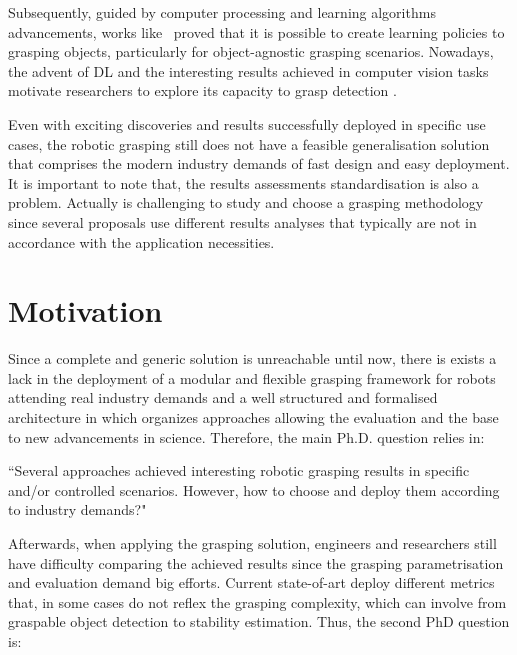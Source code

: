 Subsequently, guided by computer processing and learning algorithms advancements,  works like~\cite{Saxena2008} proved that it is possible to create learning policies to grasping objects, particularly for object-agnostic grasping scenarios. Nowadays, the advent of \ac{DL} and the interesting results achieved in computer vision tasks motivate researchers to explore its capacity to grasp detection \cite{Lenz2015,Redmon2015,Kumra2017,Watson2017,Chu2018,asif2018ensemblenet, Chen2020, Guo2017,Gariepy2019,Mousavian_2019_ICCV,Ghazaei2019,TenPas2017,Chen2019,
Mahler2016,Mahler2017b, Mahler2017d, Mahler2017,Mahler2019,song2020novel}. 

Even with exciting discoveries and results successfully deployed in specific use cases, the robotic grasping still does not have a feasible generalisation solution that comprises the modern industry demands of fast design and easy deployment. It is important to note that, the results assessments standardisation is also a problem. Actually is challenging to study and choose a grasping methodology since several proposals use different results analyses that typically are not in accordance with the application necessities. 


\section{Motivation}
\label{cap1:introduction:motiviation}




Since a complete and generic solution is unreachable until now, there is exists a lack in the deployment of a modular and flexible grasping framework for robots attending real industry demands and a well structured and formalised architecture in which organizes approaches allowing the evaluation and the base to new advancements in science. Therefore, the main Ph.D. question relies in:

\begin{flushright}
``Several approaches achieved interesting robotic grasping results in specific and/or controlled scenarios. However, how to choose and deploy them according to industry demands?"
\end{flushright}

Afterwards, when applying the grasping solution, engineers and researchers still have difficulty comparing the achieved results since the grasping parametrisation and evaluation demand big efforts. Current state-of-art deploy different metrics that, in some cases do not reflex the grasping complexity, which can involve from graspable object detection to stability estimation. Thus, the second PhD question is:

